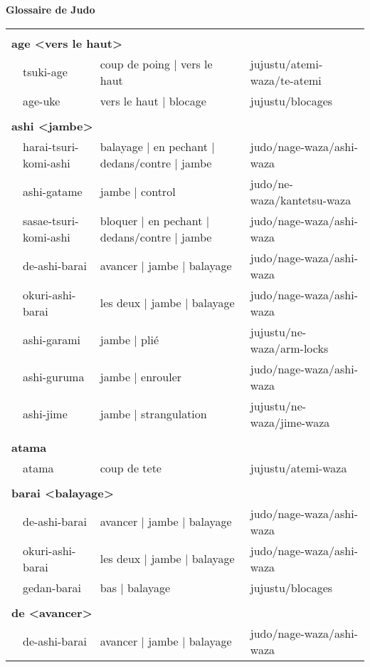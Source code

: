 \documentclass{article}%
\title%
\date{}%
\begin{document}
%
\normalsize%
\begin{center}%
\textbf{Glossaire de Judo}%
\end{center}%
\begin{longtable}{rlll}%
&&&\\%
\multicolumn{3}{l}{\textbf{age <vers le haut>}%
~%
}&\\%
&tsuki{-}age&coup de poing | vers le haut&jujustu/atemi{-}waza/te{-}atemi\\%
&age{-}uke&vers le haut | blocage&jujustu/blocages\\%
&&&\\%
\multicolumn{3}{l}{\textbf{ashi <jambe>}%
~%
}&\\%
&harai{-}tsuri{-}komi{-}ashi&balayage | en pechant | dedans/contre | jambe&judo/nage{-}waza/ashi{-}waza\\%
&ashi{-}gatame&jambe | control&judo/ne{-}waza/kantetsu{-}waza\\%
&sasae{-}tsuri{-}komi{-}ashi&bloquer | en pechant | dedans/contre | jambe&judo/nage{-}waza/ashi{-}waza\\%
&de{-}ashi{-}barai&avancer | jambe | balayage&judo/nage{-}waza/ashi{-}waza\\%
&okuri{-}ashi{-}barai&les deux | jambe | balayage&judo/nage{-}waza/ashi{-}waza\\%
&ashi{-}garami&jambe | plié&jujustu/ne{-}waza/arm{-}locks\\%
&ashi{-}guruma&jambe | enrouler&judo/nage{-}waza/ashi{-}waza\\%
&ashi{-}jime&jambe | strangulation&jujustu/ne{-}waza/jime{-}waza\\%
&&&\\%
\multicolumn{3}{l}{\textbf{atama }%
~%
}&\\%
&atama&coup de tete&jujustu/atemi{-}waza\\%
&&&\\%
\multicolumn{3}{l}{\textbf{barai <balayage>}%
~%
}&\\%
&de{-}ashi{-}barai&avancer | jambe | balayage&judo/nage{-}waza/ashi{-}waza\\%
&okuri{-}ashi{-}barai&les deux | jambe | balayage&judo/nage{-}waza/ashi{-}waza\\%
&gedan{-}barai&bas | balayage&jujustu/blocages\\%
&&&\\%
\multicolumn{3}{l}{\textbf{de <avancer>}%
~%
}&\\%
&de{-}ashi{-}barai&avancer | jambe | balayage&judo/nage{-}waza/ashi{-}waza\\%

\end{longtable}
\end{document}
